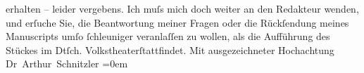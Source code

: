 \begin{ledgroupsized}[t]{13cm}
               erhalten – leider vergebens.\pend
           \pstart
           Ich muſs mich doch weiter an den Redakteur wenden, {\pb}und erſuche Sie, die
               Beantwortung meiner Fragen oder die Rückſendung meines Manuscripts umſo ſchleuniger
               veranlaſſen zu wollen, als die Aufführung des Stückes \label{K_L00282_3v}\label{K_L00282_3h} im
                  Dtſch. Volkstheaterſtattfindet.\pend
           \pstart
           Mit ausgezeichneter Hochachtung{\\[\baselineskip]}\spacefill\mbox{Dr Arthur Schnitzler}\pend
           \leftskip=0em{}\endnumbering{}\end{ledgroupsized}  \newcommand{\dateiname}{L00282}\newcommand{\titel}{Arthur Schnitzler an Wilhelm Bölsche, [12.? 11. 1893]}\newcommand{\editorInnen}{Martin Anton Müller und Gerd-Hermann Susen}
            \footnotesize
\begin{ledgroupsized}[t]{11.5cm}
\end{ledgroupsized}
         
      
